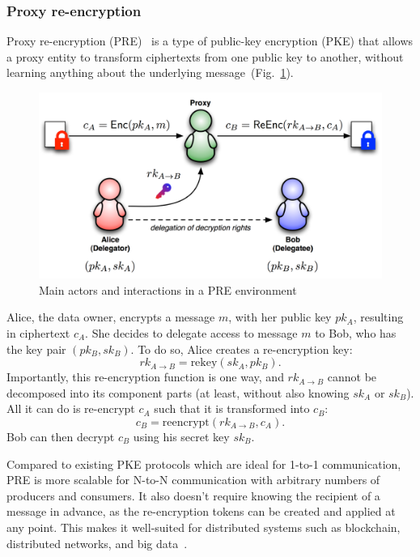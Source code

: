 \documentclass[notitlepage,longbibliography]{revtex4-1}
\begin{document}
\subsubsection{Proxy re-encryption}
Proxy re-encryption (PRE)~\cite{wiki:pre,phd:nunez} is a type of public-key encryption (PKE) that allows a proxy entity to transform ciphertexts
from one public key to another, without learning anything about the underlying message~(Fig.~\ref{fig:pre}).

\begin{figure}
\centering
    \includegraphics[width=0.6\columnwidth]{pdf/pre.png}  %
    \caption{Main actors and interactions in a PRE environment}
    \label{fig:pre}
\end{figure}

Alice, the data owner, encrypts a message $m$, with her public key $pk_A$, resulting in ciphertext $c_A$.
She decides to delegate access to message $m$ to Bob, who has the key pair $(pk_B, sk_B)$.
To do so, Alice creates a re-encryption key:
\begin{equation}
    rk_{A\rightarrow B} = \text{rekey}(sk_A, pk_B).
\end{equation}
Importantly, this re-encryption function is one way, and $rk_{A\rightarrow B}$ cannot be decomposed into its component parts
(at least, without also knowing $sk_A$ or $sk_B$).
All it can do is re-encrypt $c_A$ such that it is transformed into $c_B$:
\begin{equation}
    c_B = \text{reencrypt}(rk_{A\rightarrow B}, c_{A}).
\end{equation}
Bob can then decrypt $c_{B}$ using his secret key $sk_{B}$.

Compared to existing PKE protocols which are ideal for 1-to-1 communication, PRE is more scalable for N-to-N communication
with arbitrary numbers of producers and consumers.
It also doesn't require knowing the recipient of a message in advance, as the re-encryption tokens can be created and applied at any point.
This makes it well-suited for distributed systems such as blockchain, distributed networks, and big data~\cite{web:nucypher-hadoop}.
\end{document}
